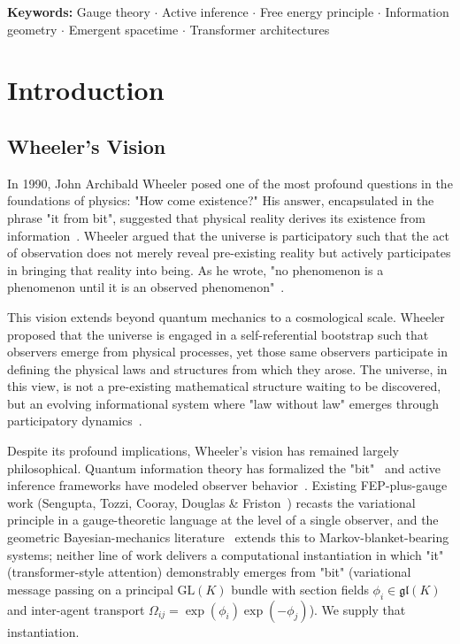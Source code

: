 \documentclass[11pt]{article}
\begin{document}
\noindent\textbf{Keywords:} Gauge theory $\cdot$ Active inference $\cdot$ Free energy principle $\cdot$ Information geometry $\cdot$ Emergent spacetime $\cdot$ Transformer architectures

\section{Introduction}

\subsection{Wheeler's Vision}

In 1990, John Archibald Wheeler posed one of the most profound questions in the foundations of physics: "How come existence?" His answer, encapsulated in the phrase "it from bit", suggested that physical reality derives its existence from information~\cite{Wheeler1990}. Wheeler argued that the universe is participatory such that the act of observation does not merely reveal pre-existing reality but actively participates in bringing that reality into being. As he wrote, "no phenomenon is a phenomenon until it is an observed phenomenon"~\cite{Wheeler1983}.

This vision extends beyond quantum mechanics to a cosmological scale. Wheeler proposed that the universe is engaged in a self-referential bootstrap such that observers emerge from physical processes, yet those same observers participate in defining the physical laws and structures from which they arose. The universe, in this view, is not a pre-existing mathematical structure waiting to be discovered, but an evolving informational system where "law without law" emerges through participatory dynamics~\cite{Wheeler1983}.

Despite its profound implications, Wheeler's vision has remained largely philosophical. Quantum information theory has formalized the "bit"~\cite{Shannon1948, CoverThomas2006} and active inference frameworks have modeled observer behavior~\cite{Friston2010, Friston2017}. Existing FEP-plus-gauge work (Sengupta, Tozzi, Cooray, Douglas \& Friston~\cite{Sengupta2016NeuronalGauge}) recasts the variational principle in a gauge-theoretic language at the level of a single observer, and the geometric Bayesian-mechanics literature~\cite{Sakthivadivel2022, KirchhoffParrPalaciosFristonKiverstein2018} extends this to Markov-blanket-bearing systems; neither line of work delivers a computational instantiation in which "it" (transformer-style attention) demonstrably emerges from "bit" (variational message passing on a principal $\mathrm{GL}(K)$ bundle with section fields $\phi_i \in \mathfrak{gl}(K)$ and inter-agent transport $\Omega_{ij} = \exp(\phi_i)\exp(-\phi_j)$). We supply that instantiation.
\end{document}

